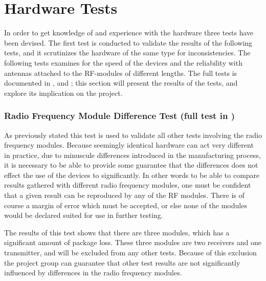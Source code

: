 \clearpage
\section{Hardware Tests} %
\label{sec:hardware_tests}
In order to get knowledge of and experience with the hardware three tests have been devised.
The first test is conducted to validate the results of the following tests, and it scrutinizes the hardware of the same type for inconsistencies.
The following tests examines for the speed of the devices and the reliability with antennas attached to the RF-modules of different lengths.
The full tests is documented in ,  and ; this section will present the results of the tests, and explore its implication on the project.

\subsubsection*{Radio Frequency Module Difference Test (full test in )}%
\label{ssub:radio_frequency_module_difference_test}
As previously stated this test is used to validate all other tests involving the radio frequency modules.
Because seemingly identical hardware can act very different in practice, due to minuscule differences introduced in the manufacturing process, it is necessary to be able to provide some guarantee that the differences does not effect the use of the devices to significantly.
In other words to be able to compare results gathered with different radio frequency modules, one must be confident that a given result can be reproduced by any of the RF modules.
There is of course a margin of error which must be accepted, or else none of the modules would be declared suited for use in further testing.

The results of this test shows that there are three modules, which has a significant amount of package loss.
These three modules are two receivers and one transmitter, and will be excluded from any other tests.
Because of this exclusion the project group can guarantee that other test results are not significantly influenced by differences in the radio frequency modules. 

